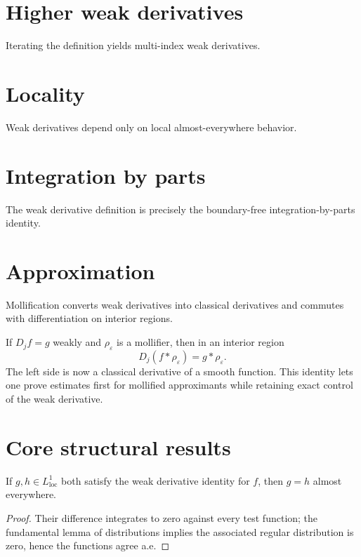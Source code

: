 \section{Higher weak derivatives}
Iterating the definition yields multi-index weak derivatives.

\section{Locality}
Weak derivatives depend only on local almost-everywhere behavior.

\section{Integration by parts}
The weak derivative definition is precisely the boundary-free integration-by-parts identity.

\section{Approximation}
Mollification converts weak derivatives into classical derivatives and commutes with differentiation on interior regions.


\begin{example}\label{ex:iii20-expand-03}
If \(D_jf=g\) weakly and \(\rho_\varepsilon\) is a mollifier, then in an
interior region
\[
D_j(f*\rho_\varepsilon)=g*\rho_\varepsilon.
\]
The left side is now a classical derivative of a smooth function. This identity
lets one prove estimates first for mollified approximants while retaining exact
control of the weak derivative.
\end{example}
\section{Core structural results}

\begin{theorem}\label{thm:iii20-01}
If $g,h\in L^1_{\mathrm{loc}}$ both satisfy the weak derivative identity for $f$, then $g=h$ almost everywhere.
\begin{proof}
Their difference integrates to zero against every test function; the fundamental lemma of distributions implies the associated regular distribution is zero, hence the functions agree a.e.
\end{proof}
\end{theorem}

